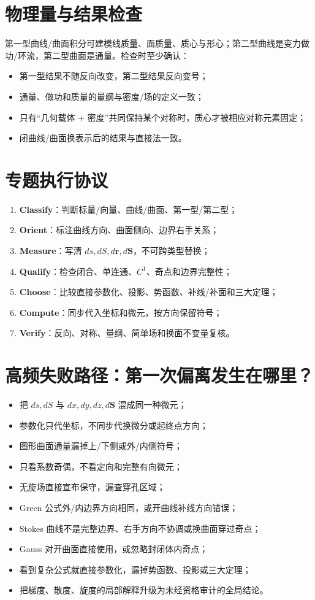 \documentclass[11pt,a4paper,fontset=fandol]{ctexart}
\newcommand{\kw}[1]{\textbf{\color{deep}#1}}
\begin{document}
\section{物理量与结果检查}

第一型曲线/曲面积分可建模线质量、面质量、质心与形心；第二型曲线是变力做功/环流，第二型曲面是通量。检查时至少确认：
\begin{itemize}
  \item 第一型结果不随反向改变，第二型结果反向变号；
  \item 通量、做功和质量的量纲与密度/场的定义一致；
  \item 只有“几何载体 + 密度”共同保持某个对称时，质心才被相应对称元素固定；
  \item 闭曲线/曲面换表示后的结果与直接法一致。
\end{itemize}

\section{专题执行协议}
\begin{enumerate}
  \item \kw{Classify}：判断标量/向量、曲线/曲面、第一型/第二型；
  \item \kw{Orient}：标注曲线方向、曲面侧向、边界右手关系；
  \item \kw{Measure}：写清 $ds,dS,d\mathbf r,d\mathbf S$，不可跨类型替换；
  \item \kw{Qualify}：检查闭合、单连通、$C^1$、奇点和边界完整性；
  \item \kw{Choose}：比较直接参数化、投影、势函数、补线/补面和三大定理；
  \item \kw{Compute}：同步代入坐标和微元，按方向保留符号；
  \item \kw{Verify}：反向、对称、量纲、简单场和换面不变量复核。
\end{enumerate}

\section{高频失败路径：第一次偏离发生在哪里？}
\begin{itemize}
  \item 把 $ds,dS$ 与 $dx,dy,dz,d\mathbf S$ 混成同一种微元；
  \item 参数化只代坐标，不同步代换微分或起终点方向；
  \item 图形曲面通量漏掉上/下侧或外/内侧符号；
  \item 只看系数奇偶，不看定向和完整有向微元；
  \item 无旋场直接宣布保守，漏查穿孔区域；
  \item Green 公式外/内边界方向相同，或开曲线补线方向错误；
  \item Stokes 曲线不是完整边界、右手方向不协调或换曲面穿过奇点；
  \item Gauss 对开曲面直接使用，或忽略封闭体内奇点；
  \item 看到复杂公式就直接参数化，漏掉势函数、投影或三大定理；
  \item 把梯度、散度、旋度的局部解释升级为未经资格审计的全局结论。
\end{itemize}
\end{document}
